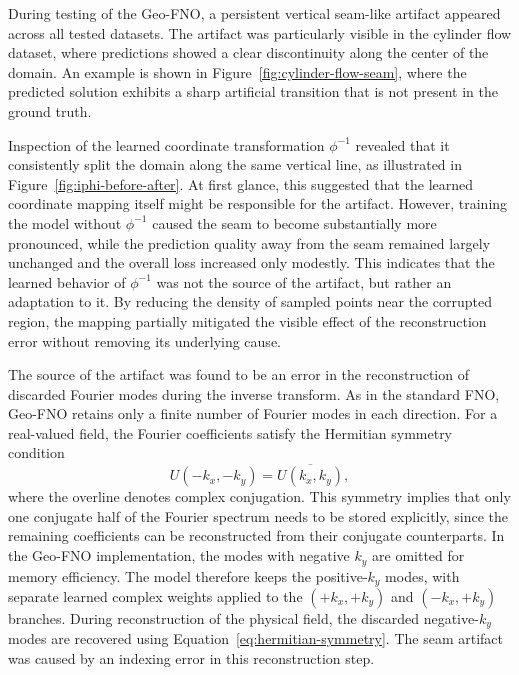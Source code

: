 During testing of the Geo-FNO, a persistent vertical seam-like artifact appeared across all tested datasets. The artifact was particularly visible in the cylinder flow dataset, where predictions showed a clear discontinuity along the center of the domain. An example is shown in Figure~\ref{fig:cylinder-flow-seam}, where the predicted solution exhibits a sharp artificial transition that is not present in the ground truth.

Inspection of the learned coordinate transformation $\phi^{-1}$ revealed that it consistently split the domain along the same vertical line, as illustrated in Figure~\ref{fig:iphi-before-after}. At first glance, this suggested that the learned coordinate mapping itself might be responsible for the artifact. However, training the model without $\phi^{-1}$ caused the seam to become substantially more pronounced, while the prediction quality away from the seam remained largely unchanged and the overall loss increased only modestly. This indicates that the learned behavior of $\phi^{-1}$ was not the source of the artifact, but rather an adaptation to it. By reducing the density of sampled points near the corrupted region, the mapping partially mitigated the visible effect of the reconstruction error without removing its underlying cause.

The source of the artifact was found to be an error in the reconstruction of discarded Fourier modes during the inverse transform. As in the standard FNO, Geo-FNO retains only a finite number of Fourier modes in each direction. For a real-valued field, the Fourier coefficients satisfy the Hermitian symmetry condition
\begin{equation}
U(-k_x, -k_y) = \overline{U(k_x, k_y)},
\label{eq:hermitian-symmetry}
\end{equation}
where the overline denotes complex conjugation. This symmetry implies that only one conjugate half of the Fourier spectrum needs to be stored explicitly, since the remaining coefficients can be reconstructed from their conjugate counterparts. In the Geo-FNO implementation, the modes with negative \(k_y\) are omitted for memory efficiency. The model therefore keeps the positive-\(k_y\) modes, with separate learned complex weights applied to the \((+k_x,+k_y)\) and \((-k_x,+k_y)\) branches. During reconstruction of the physical field, the discarded negative-\(k_y\) modes are recovered using Equation~\ref{eq:hermitian-symmetry}. The seam artifact was caused by an indexing error in this reconstruction step.

